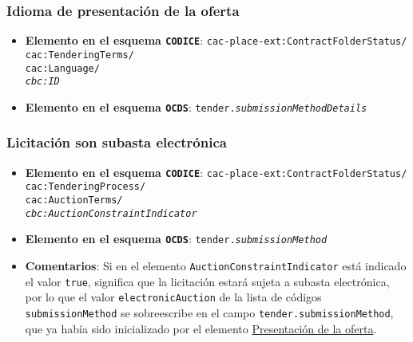         \subsubsection{Idioma de presentación de la oferta}
            \begin{itemize}
                \item \textbf{Elemento en el esquema \texttt{CODICE}}:
                    \tabto{7.6cm} \texttt{cac-place-ext:ContractFolderStatus/} \\
                    \tabto{7.6cm} \texttt{cac:TenderingTerms/} \\
                    \tabto{7.6cm} \texttt{cac:Language/} \\
                    \tabto{7.6cm} \texttt{\textit{cbc:ID}}
                \item \textbf{Elemento en el esquema \texttt{OCDS}}:
                    \tabto{7.6cm} \texttt{tender.\textit{submissionMethodDetails}}
            \end{itemize}
        
        \subsubsection{Licitación son subasta electrónica}
            \begin{itemize}
                \item \textbf{Elemento en el esquema \texttt{CODICE}}:
                    \tabto{7.6cm} \texttt{cac-place-ext:ContractFolderStatus/} \\
                    \tabto{7.6cm} \texttt{cac:TenderingProcess/} \\
                    \tabto{7.6cm} \texttt{cac:AuctionTerms/} \\
                    \tabto{7.6cm} \texttt{\textit{cbc:AuctionConstraintIndicator}}
                \item \textbf{Elemento en el esquema \texttt{OCDS}}:
                    \tabto{7.6cm} \texttt{tender.\textit{submissionMethod}}
                \item \textbf{Comentarios}: Si en el elemento \texttt{AuctionConstraintIndicator} está indicado el valor \texttt{true}, significa que la licitación estará sujeta a subasta electrónica, por lo que el valor \texttt{electronicAuction} de la lista de códigos \texttt{submissionMethod} \cite{CR11} se sobreescribe en el campo \texttt{tender.submissionMethod}, que ya había sido inicializado por el elemento \hyperref[subsec:PresentacionOferta]{Presentación de la oferta}.
            \end{itemize}
        
